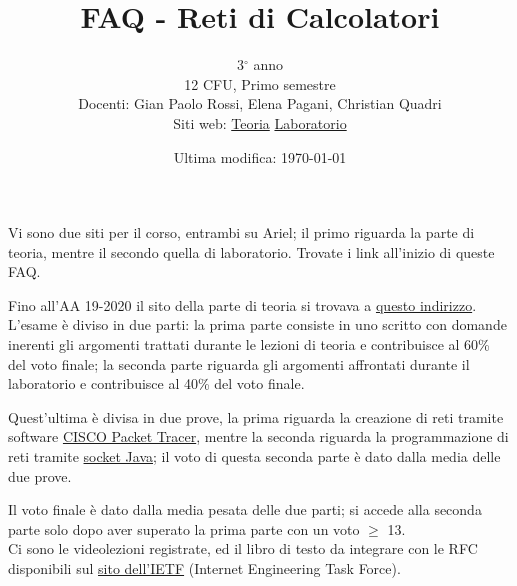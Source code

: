 \documentclass{article}
\title{FAQ - \textbf{Reti di Calcolatori}}
\date{Ultima modifica: \today}
\author{
	3$^{\circ}$ anno\\12 CFU, Primo semestre\\
	Docenti: Gian Paolo Rossi, Elena Pagani, Christian Quadri\\ 
	Siti web:
	\href{https://grossircc.ariel.ctu.unimi.it/v5/frm3/ThreadList.aspx?name=contenuti}{Teoria}
	\href{https://epaganircl.ariel.ctu.unimi.it/v5/frm3/ThreadList.aspx?name=contenuti}{Laboratorio}
}
\begin{document}
 
	\maketitle
	
	\begin{enumerate}
		
		\rmfamily
		Vi sono due siti per il corso, entrambi su Ariel; il primo riguarda la parte di teoria, mentre il secondo quella di laboratorio. Trovate i link all'inizio di queste FAQ.
		
		Fino all'AA 19-2020 il sito della parte di teoria si trovava a \href{http://old.nptlab.di.unimi.it/index.php/reti-di-calcolatori.html}{questo indirizzo}. \\
		
		L'esame è diviso in due parti: la prima parte consiste in uno scritto con domande inerenti gli argomenti trattati durante le lezioni di teoria e contribuisce al 60\% del voto finale; la seconda parte riguarda gli argomenti affrontati durante il laboratorio e contribuisce al 40\% del voto finale.
		
		Quest'ultima è divisa in due prove, la prima riguarda la creazione di reti tramite software \href{https://en.wikipedia.org/wiki/Packet_Tracer}{CISCO Packet Tracer}, mentre la seconda riguarda la programmazione di reti tramite \href{https://docs.oracle.com/javase/8/docs/api/index.html?java/net/Socket.html}{socket Java}; il voto di questa seconda parte è dato dalla media delle due prove.
		
		Il voto finale è dato dalla media pesata delle due parti; si accede alla seconda parte solo dopo aver superato la prima parte con un voto $\geq$ 13. \\
		
		Ci sono le videolezioni registrate, ed il libro di testo da integrare con le RFC disponibili sul \href{https://ietf.org/standards/rfcs/}{sito dell'IETF} (Internet Engineering Task Force).
		
	\end{enumerate}
	
\end{document}
